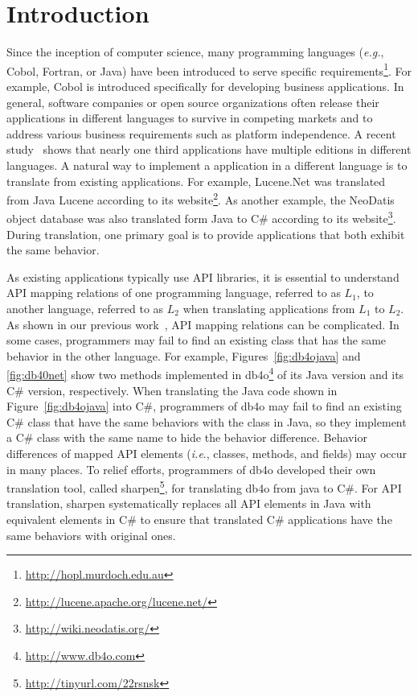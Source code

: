 \section{Introduction}
\label{sec:introduction}

Since the inception of computer science, many programming languages (\emph{e.g.}, Cobol, Fortran, or Java) have been introduced to serve specific requirements\footnote{\url{http://hopl.murdoch.edu.au}}. For example, Cobol is introduced specifically for developing business applications. In general, software companies or open source organizations often release their applications in different languages to survive in competing markets and to address various business requirements such as platform independence. A recent study~\cite{jones1998estimating} shows that nearly one third applications have multiple editions in different languages. A natural way to implement a application in a different language is to translate from existing applications. For example, Lucene.Net was translated from Java Lucene according to its website\footnote{\url{http://lucene.apache.org/lucene.net/}}. As another example, the NeoDatis object database was also translated form Java to C\# according to its website\footnote{\url{http://wiki.neodatis.org/}}. During translation, one primary goal is to provide applications that both exhibit the same behavior.


As existing applications typically use API libraries, it is essential to understand API mapping relations of one programming language, referred to as $L_1$, to another language, referred to as $L_2$ when translating applications from $L_1$ to $L_2$. As shown in our previous work~\cite{zhong2010mining}, API mapping relations can be complicated. In some cases, programmers may fail to find an existing class that has the same behavior in the other language. For example, Figures~\ref{fig:db4ojava} and \ref{fig:db40net} show two methods implemented in db4o\footnote{\url{http://www.db4o.com}} of its Java version and its C\# version, respectively. When translating the Java code shown in Figure~\ref{fig:db4ojava} into C\#, programmers of db4o may fail to find an existing C\# class that have the same behaviors with the  class in Java, so they implement a C\# class with the same name to hide the behavior difference. Behavior differences of mapped API elements (\emph{i.e}., classes, methods, and fields) may occur in many places. To relief efforts, programmers of db4o developed their own translation tool, called sharpen\footnote{\url{http://tinyurl.com/22rsnsk}}, for translating db4o from java to C\#. For API translation, sharpen systematically replaces all API elements in Java with equivalent elements in C\# to ensure that translated C\# applications have the same behaviors with original ones.


